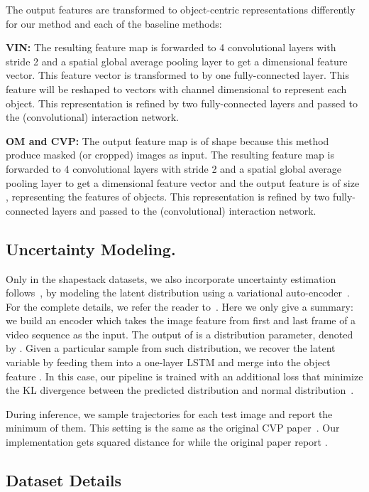 \documentclass{article} \usepackage{iclr2021_conference,times}
\begin{document}
The output features are transformed to object-centric representations differently for our method and each of the baseline methods:

\textbf{VIN:} The resulting feature map is forwarded to 4 convolutional layers with stride 2 and a spatial global average pooling layer to get a  dimensional feature vector. This feature vector is transformed to  by one fully-connected layer. This feature will be reshaped to  vectors with  channel dimensional to represent each object. This representation is refined by two  fully-connected layers and passed to the (convolutional) interaction network.

\textbf{OM and CVP:} The output feature map is of shape  because this method produce  masked (or cropped) images as input. The resulting feature map is forwarded to 4 convolutional layers with stride 2 and a spatial global average pooling layer to get a  dimensional feature vector and the output feature is of size , representing the features of  objects. This representation is refined by two  fully-connected layers and passed to the (convolutional) interaction network.

\subsection{Uncertainty Modeling.} \label{sec:appendix:cvp}

Only in the shapestack datasets, we also incorporate uncertainty estimation follows~\citep{ye2019cvp}, by modeling the latent distribution using a variational auto-encoder~\citep{kingma2013auto}. For the complete details, we refer the reader to~\citep{ye2019cvp}. Here we only give a summary: we build an encoder  which takes the image feature from first  and last frame  of a video sequence as the input. The output of  is a distribution parameter, denoted by . Given a particular sample from such distribution, we recover the latent variable by feeding them into a one-layer LSTM and merge into the object feature . In this case, our pipeline is trained with an additional loss that minimize the KL divergence between the predicted distribution and normal distribution~\citep{kingma2013auto}.

During inference, we sample  trajectories for each test image and report the minimum of them. This setting is the same as the original CVP paper~\cite{ye2019cvp}. Our implementation gets  squared  distance for  while the original paper report .

\subsection{Dataset Details}
\end{document}
